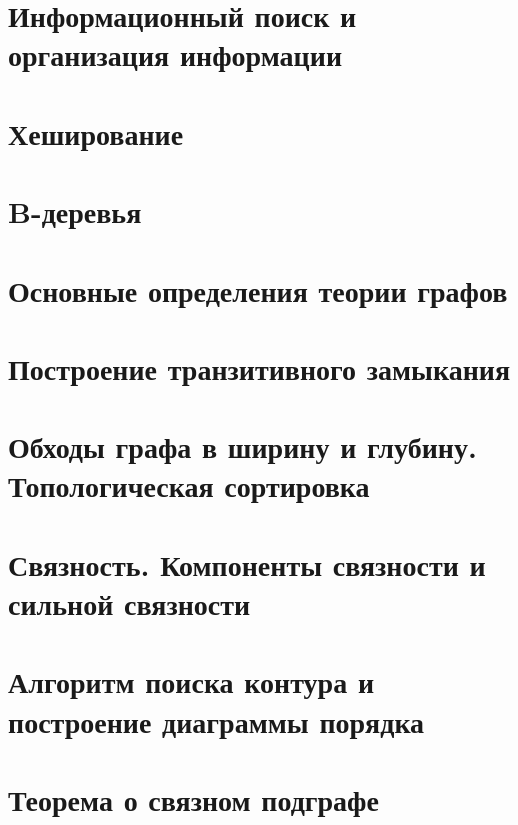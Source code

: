 \documentclass[12pt, fleqn]{article}
\begin{document}
\section{Информационный поиск и организация информации}
\newpage

\section{Хеширование}
\newpage



\section{B-деревья}
\newpage



\section{Основные определения теории графов}
\newpage

\section{Построение транзитивного замыкания}
\newpage

\section{Обходы графа в ширину и глубину. Топологическая сортировка}
\newpage

\section{Связность. Компоненты связности и сильной связности}
\newpage

\section{Алгоритм поиска контура и построение диаграммы порядка}
\newpage

\section{Теорема о связном подграфе}
\end{document}
